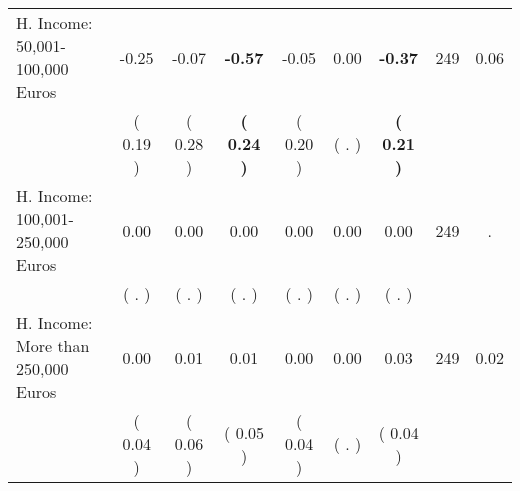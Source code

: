 \begin{tabular}{lcccccccc}
H. Income: 50,001-100,000 Euros &     -0.25 &     -0.07 & \textbf{    -0.57} &     -0.05 &      0.00 & \textbf{    -0.37} & 249 &       0.06 \\ 
 & (     0.19 ) & (     0.28 ) & \textbf{(     0.24 )} & (     0.20 ) & (        . ) & \textbf{(     0.21 )} & \\
H. Income: 100,001-250,000 Euros &      0.00 &      0.00 &      0.00 &      0.00 &      0.00 &      0.00 & 249 &          . \\ 
 & (        . ) & (        . ) & (        . ) & (        . ) & (        . ) & (        . ) & \\
H. Income: More than 250,000 Euros &      0.00 &      0.01 &      0.01 &      0.00 &      0.00 &      0.03 & 249 &       0.02 \\ 
 & (     0.04 ) & (     0.06 ) & (     0.05 ) & (     0.04 ) & (        . ) & (     0.04 ) & \\
\bottomrule
\end{tabular}
